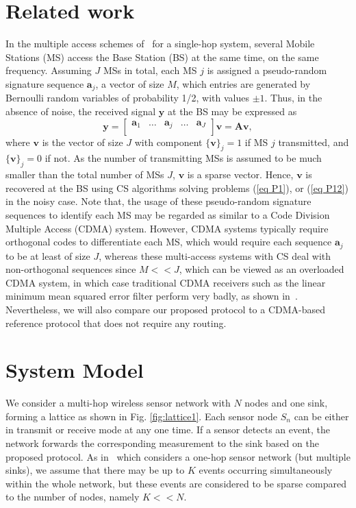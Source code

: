 \documentclass[letterpaper,conference]{IEEEtran}
\begin{document}
\section{Related work}
\label{sec RelatedWork}

In the multiple access schemes of~\cite{Qas09sep}\cite{Mao10apr}\cite{Bha09jun} for a single-hop system, several Mobile Stations (MS) access the Base Station (BS) at the same time, on the same frequency.
Assuming $J$ MSs in total, each MS $j$ is assigned a pseudo-random signature sequence $\mathbf{a}_j$, a vector of size $M$, which entries are generated by Bernoulli random variables of probability 1/2, with values $\pm 1$. Thus, in the absence of noise, the received signal $\mathbf{y}$ at the BS may be expressed as
\[
\mathbf{y}=
  \begin{bmatrix}
    \mathbf{a}_1 & \hdots & \mathbf{a}_j & \hdots  & \mathbf{a}_J\\
  \end{bmatrix}\mathbf{v}
  =\mathbf{A}\mathbf{v},
 \]
where $\mathbf{v}$ is the vector of size $J$ with component $\{\mathbf{v}\}_j=1$ if MS $j$ transmitted, and $\{\mathbf{v}\}_j=0$ if not. As the number of transmitting MSs is assumed to be much smaller than the total number of MSs $J$, $\mathbf{v}$ is a sparse vector. Hence, $\mathbf{v}$ is recovered at the BS using CS algorithms solving problems (\ref{eq P1}), or (\ref{eq P12}) in the noisy case.
Note that, the usage of these pseudo-random signature sequences to identify each MS may be regarded as similar to a Code Division Multiple Access (CDMA) system. However, CDMA systems typically require orthogonal codes to differentiate each MS, which would require each sequence $\mathbf{a}_j$ to be at least of size $J$, whereas these multi-access systems with CS deal with non-orthogonal sequences since $M<<J$, which can be viewed as an overloaded CDMA system, in which case traditional CDMA receivers such as the linear minimum mean squared error filter perform very badly, as shown in~\cite{Bha09jun}.
Nevertheless, we will also compare our proposed protocol to a CDMA-based reference protocol that does not require any routing.

\section{System Model}
\label{sec SysMod}

We consider a multi-hop wireless sensor network with $N$ nodes and one sink, forming a lattice as shown in Fig. \ref{fig:lattice1}. Each sensor node $S_n$ can be either in transmit or receive mode at any one time. If a sensor detects an event, the network forwards the corresponding measurement to the sink based on the proposed protocol. As in~\cite{Men09mar} which considers a one-hop sensor network (but multiple sinks), we assume that there may be up to $K$ events occurring simultaneously within the whole network, but these events are considered to be sparse compared to the number of nodes, namely $K << N$.
\end{document}
